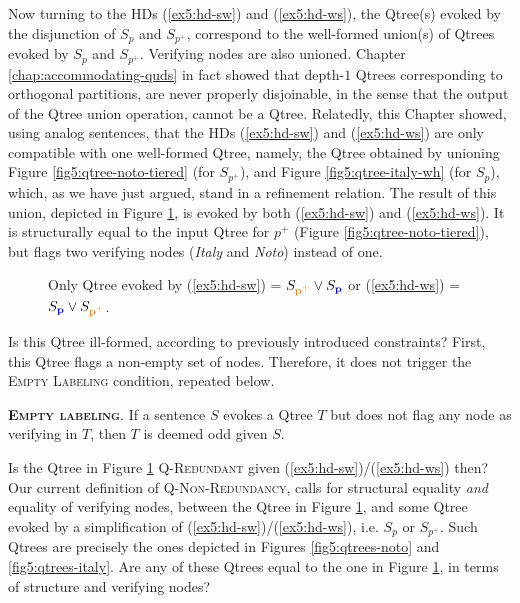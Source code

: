 Now turning to the HDs (\ref{ex5:hd-sw}) and (\ref{ex5:hd-ws}), the Qtree(s) evoked by the disjunction of $S_p$ and $S_{p^+}$, correspond to the well-formed union(s) of Qtrees evoked by $S_p$ and $S_{p^+}$. Verifying nodes are also unioned. Chapter \ref{chap:accommodating-quds} in fact showed that depth-$1$ Qtrees corresponding to orthogonal partitions, are never properly disjoinable, in the sense that the output of the Qtree union operation, cannot be a Qtree. Relatedly, this Chapter showed, using analog sentences, that the HDs (\ref{ex5:hd-sw}) and (\ref{ex5:hd-ws}) are only compatible with one well-formed Qtree, namely, the Qtree obtained by unioning Figure \ref{fig5:qtree-noto-tiered} (for $S_{p^+}$), and Figure \ref{fig5:qtree-italy-wh} (for $S_{p}$), which, as we have just argued, stand in a refinement relation. The result of this union, depicted in Figure \ref{fig5:qtree-noto-or-italy}, is evoked by both (\ref{ex5:hd-sw}) and (\ref{ex5:hd-ws}). It is structurally equal to the input Qtree for $p^+$ (Figure \ref{fig5:qtree-noto-tiered}), but flags two verifying nodes (\textit{Italy} and \textit{Noto}) instead of one.

\begin{figure}[H]
	\centering
	\caption[]{Only Qtree evoked by (\ref{ex5:hd-sw}) = $S_{\textbf{\textcolor{orange}{p$^+$}}} \vee S_{\textbf{\textcolor{blue}{p}}}$ or (\ref{ex5:hd-ws}) = $S_{\textbf{\textcolor{blue}{p}}} \vee S_{\textbf{\textcolor{orange}{p$^+$}}}$.}\label{fig5:qtree-noto-or-italy}
\end{figure}

Is this Qtree ill-formed, according to previously introduced constraints? First, this Qtree flags a non-empty set of nodes. Therefore, it does not trigger the \textsc{Empty Labeling} condition, repeated below.

\begin{exe}
	 {\textsc{\textbf{Empty labeling}}. If a sentence $S$ evokes a Qtree $T$ but does not flag any node as verifying in $T$, then $T$ is deemed odd given $S$.}
\end{exe}

Is the Qtree in Figure \ref{fig5:qtree-noto-or-italy} \textsc{Q-Redundant} given (\ref{ex5:hd-sw})/(\ref{ex5:hd-ws}) then? Our current definition of \textsc{Q-Non-Redundancy}, calls for structural equality \textit{and} equality of verifying nodes, between the Qtree in Figure \ref{fig5:qtree-noto-or-italy}, and some Qtree evoked by a simplification of (\ref{ex5:hd-sw})/(\ref{ex5:hd-ws}), i.e. $S_p$ or $S_{p^+}$. Such Qtrees are precisely the ones depicted in Figures \ref{fig5:qtrees-noto} and \ref{fig5:qtrees-italy}. Are any of these Qtrees equal to the one in Figure \ref{fig5:qtree-noto-or-italy}, in terms of structure and verifying nodes?

